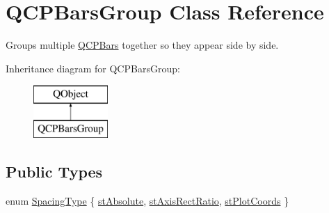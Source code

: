\hypertarget{classQCPBarsGroup}{}\section{Q\+C\+P\+Bars\+Group Class Reference}
\label{classQCPBarsGroup}


Groups multiple \hyperlink{classQCPBars}{Q\+C\+P\+Bars} together so they appear side by side.  


Inheritance diagram for Q\+C\+P\+Bars\+Group\+:\begin{figure}[H]
\begin{center}
\leavevmode
\includegraphics[height=2.000000cm]{classQCPBarsGroup}
\end{center}
\end{figure}
\subsection*{Public Types}
\begin{DoxyCompactItemize}
\item 
enum \hyperlink{classQCPBarsGroup_a4c0521120a97e60bbca37677a37075b6}{Spacing\+Type} \{ \hyperlink{classQCPBarsGroup_a4c0521120a97e60bbca37677a37075b6ab53fa3efaf14867dd0f14d41d64e42ac}{st\+Absolute}, 
\hyperlink{classQCPBarsGroup_a4c0521120a97e60bbca37677a37075b6ae94b05c27bc985dcdd8b1e1b7f163d26}{st\+Axis\+Rect\+Ratio}, 
\hyperlink{classQCPBarsGroup_a4c0521120a97e60bbca37677a37075b6ad369cee6287e0a86e8c2b643a3168c54}{st\+Plot\+Coords}
 \}
\end{DoxyCompactItemize}
